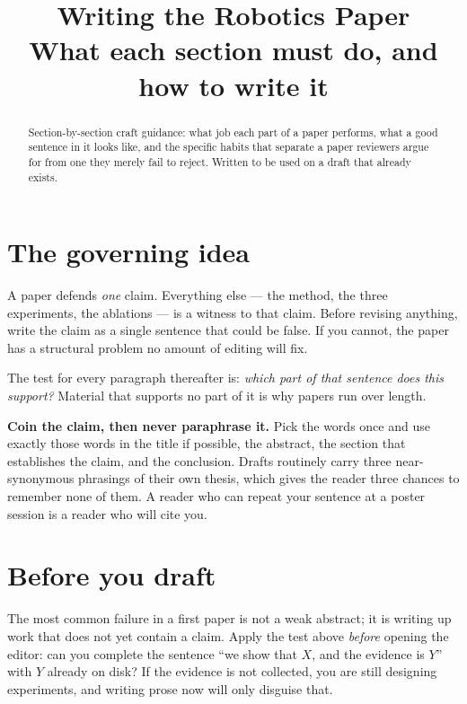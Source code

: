 \documentclass[11pt,a4paper]{article}
\title{\vspace{-1.4cm}Writing the Robotics Paper\\
  \large What each section must do, and how to write it}
\author{}
\date{}
\newcommand{\lead}[1]{\medskip\noindent\textbf{#1}\quad}
\begin{document}
\maketitle
\vspace{-1.8cm}

\begin{abstract}
\noindent Section-by-section craft guidance: what job each part of a paper
performs, what a good sentence in it looks like, and the specific habits that
separate a paper reviewers argue for from one they merely fail to reject.
Written to be used on a draft that already exists.
\end{abstract}

\tableofcontents
\vspace{0.4cm}

\section{The governing idea}

A paper defends \emph{one} claim. Everything else --- the method, the three
experiments, the ablations --- is a witness to that claim. Before revising
anything, write the claim as a single sentence that could be false. If you
cannot, the paper has a structural problem no amount of editing will fix.

The test for every paragraph thereafter is: \emph{which part of that sentence
does this support?} Material that supports no part of it is why papers run
over length.

\lead{Coin the claim, then never paraphrase it.} Pick the words once and use
exactly those words in the title if possible, the abstract, the section that
establishes the claim, and the conclusion. Drafts routinely carry three
near-synonymous phrasings of their own thesis, which gives the reader three
chances to remember none of them. A reader who can repeat your sentence at a
poster session is a reader who will cite you.

\section{Before you draft}

The most common failure in a first paper is not a weak abstract; it is
writing up work that does not yet contain a claim. Apply the test above
\emph{before} opening the editor: can you complete the sentence ``we show
that $X$, and the evidence is $Y$'' with $Y$ already on disk? If the
evidence is not collected, you are still designing experiments, and writing
prose now will only disguise that.
\end{document}

